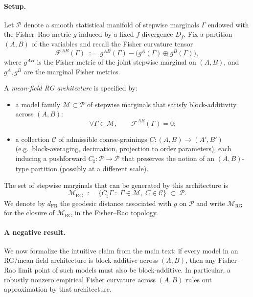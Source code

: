 \documentclass[11pt]{article}
\newcommand{\1}{\mathbf{1}}
\begin{document}
\paragraph{Setup.}
Let $\mathcal P$ denote a smooth statistical manifold of stepwise marginals $\Gamma$ endowed with the Fisher--Rao metric $g$ induced by a fixed $f$-divergence $D_f$. Fix a partition $(A,B)$ of the variables and recall the Fisher curvature tensor
\[
	\mathcal F^{AB}(\Gamma)
	\;:=\;
	g^{AB}(\Gamma) - \bigl(g^{A}(\Gamma) \oplus g^{B}(\Gamma)\bigr),
\]
where $g^{AB}$ is the Fisher metric of the joint stepwise marginal on $(A,B)$, and $g^A,g^B$ are the marginal Fisher metrics.

A \emph{mean-field RG architecture} is specified by:
\begin{itemize}[leftmargin=1.5em]
  \item a model family $\mathcal M \subset \mathcal P$ of stepwise marginals that
        satisfy block-additivity across $(A,B)$:
        \[
        \forall \Gamma \in \mathcal M,\qquad \mathcal F^{AB}(\Gamma) = 0;
        \]
  \item a collection $\mathcal C$ of admissible coarse-grainings
        $C:(A,B)\to(A',B')$ (e.g.\ block-averaging, decimation, projection
        to order parameters), each inducing a pushforward
        $C_{\sharp}:\mathcal P\to\mathcal P$ that preserves the notion of
        an $(A,B)$-type partition (possibly at a different scale).
\end{itemize}

The set of stepwise marginals that can be generated by this architecture is
\[
\mathcal M_{\mathrm{RG}}
\;:=\;
\bigl\{
  C_{\sharp}\Gamma
  \;:\;
  \Gamma \in \mathcal M,\; C\in\mathcal C
\bigr\}
\;\subset\; \mathcal P.
\]
We denote by $d_{\mathrm{FR}}$ the geodesic distance associated with $g$ on $\mathcal P$ and write $\overline{\mathcal M_{\mathrm{RG}}}$ for the closure of $\mathcal M_{\mathrm{RG}}$ in the Fisher--Rao topology.

\paragraph{A negative result.}
We now formalize the intuitive claim from the main text: if every model in an RG/mean-field architecture is block-additive across $(A,B)$, then any Fisher--Rao limit point of such models must also be block-additive. In particular, a robustly nonzero empirical Fisher curvature across $(A,B)$ rules out approximation by that architecture.
\end{document}

